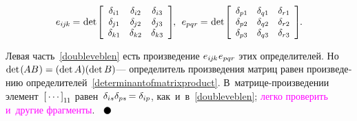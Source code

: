 \begin{otherlanguage}{russian}
\nopagebreak\vspace{-0.25em}\begin{equation*}
e_{i\hspace{-0.1ex}j\hspace{-0.1ex}k} \hspace{-0.1ex} = \hspace{.1ex}
\operatorname{det}\hspace{-0.25ex} \scalebox{0.96}[0.96]{$\left[\begin{array}{ccc}
\delta_{i1} & \delta_{i2} & \delta_{i3} \\
\delta_{\hspace{-0.1ex}j1} & \delta_{\hspace{-0.1ex}j2} & \delta_{\hspace{-0.1ex}j3} \\
\delta_{k1} & \delta_{k2} & \delta_{k3}
\end{array}\right]$} \hspace{-0.25ex}, \:\:
e_{pqr} \hspace{-0.1ex} = \hspace{.1ex}
\operatorname{det}\hspace{-0.25ex} \scalebox{0.96}[0.96]{$\left[\begin{array}{ccc}
\delta_{p1} & \delta_{q1} & \delta_{r1} \\
\delta_{p2} & \delta_{q2} & \delta_{r2} \\
\delta_{p3} & \delta_{q3} & \delta_{r3}
\end{array}\right]$}
\hspace{-0.2ex} .
\end{equation*}

\vspace{-0.1em}\noindent
Левая часть~\eqref{doubleveblen} есть произведение ${e_{i\hspace{-0.1ex}j\hspace{-0.1ex}k} \hspace{.1ex} e_{pqr}}$ этих определителей.
Но~${\operatorname{det} \hspace{.2ex} (\hspace{-0.1ex}AB\hspace{.1ex}) = (\operatorname{det} A)(\operatorname{det} B)}$\:--- определитель произведения матриц равен произведению определителей~\eqref{determinantofmatrixproduct}.
В~матрице\hbox{-}произведении элемент~${\left[{\,\cdots\,}\right]}_{1\hspace{-0.1ex}1}$ равен~${\delta_{is} \delta_{ps} \hspace{-0.2ex} = \delta_{ip}}$, как~и~в~\eqref{doubleveblen}; \textcolor{magenta}{легко проверить и~другие фрагменты}.
${ \hspace{.6em}
\tikz[baseline=-0.6ex] \draw [color=black, fill=black] (0, 0) circle (.8ex); }$


\end{otherlanguage}
